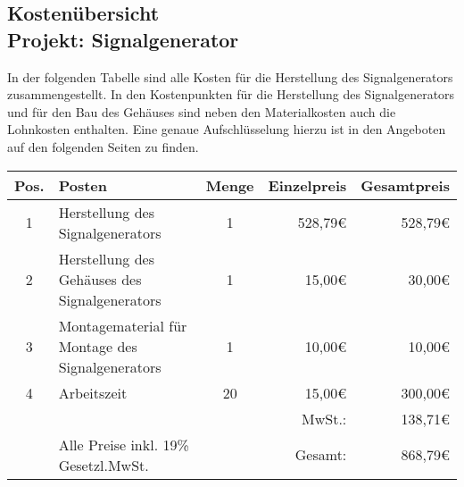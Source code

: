 \begin{center}
\section[Kostenübersicht]{Kostenübersicht \\ Projekt: Signalgenerator}
\end{center}
In der folgenden Tabelle sind alle Kosten für die Herstellung des Signalgenerators zusammengestellt. In den Kostenpunkten für die Herstellung des Signalgenerators und für den Bau des Gehäuses sind neben den Materialkosten auch die Lohnkosten enthalten. Eine genaue Aufschlüsselung hierzu ist in den Angeboten auf den folgenden Seiten zu finden.
\bigskip
\begin{center}

\begin{tabular}{cp{7cm}cr|r|}
\hline
\multicolumn{1}{|l|}{Pos.} & \multicolumn{1}{l|}{Posten} & \multicolumn{1}{l|}{Menge} & Einzelpreis & Gesamtpreis \\ \hline
\multicolumn{1}{|c|}{1} & \multicolumn{1}{l|}{Herstellung des Signalgenerators} & \multicolumn{1}{c|}{1} & 528,79\euro & 528,79\euro \\ \hline
\multicolumn{1}{|c|}{2} & \multicolumn{1}{l|}{Herstellung des Gehäuses des Signalgenerators} & \multicolumn{1}{c|}{1} & 15,00\euro & 30,00\euro \\ \hline
\multicolumn{1}{|c|}{3} & \multicolumn{1}{l|}{Montagematerial für Montage des Signalgenerators} & \multicolumn{1}{c|}{1} & 10,00\euro & 10,00\euro \\ \hline
\multicolumn{1}{|c|}{4} & \multicolumn{1}{l|}{Arbeitszeit} & \multicolumn{1}{c|}{20} & 15,00\euro & 300,00\euro \\ \hline
 & & & MwSt.: & 138,71\euro \\ \cline{5-5}
                        & Alle Preise inkl. 19\% Gesetzl.MwSt. &                       & Gesamt: & 868,79\euro \\ \cline{5-5} 
\end{tabular}

\end{center}



